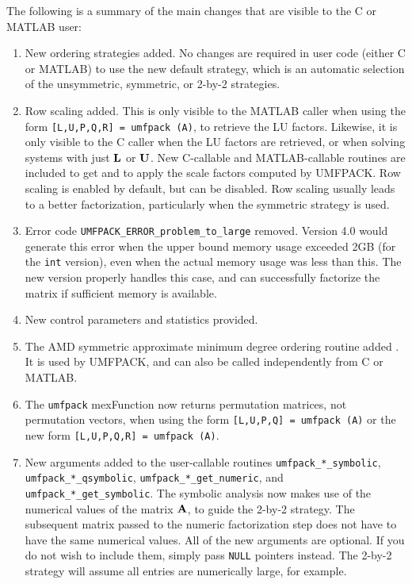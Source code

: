 \documentclass[11pt]{article}
\newcommand{\m}[1]{{\bf{#1}}}       %
\begin{document}
The following is a summary of the main changes that are visible to the C
or MATLAB user:

\begin{enumerate}

\item New ordering strategies added.  No changes are required in user code
    (either C or MATLAB) to use the new default strategy, which is an automatic
    selection of the unsymmetric, symmetric, or 2-by-2 strategies.

\item Row scaling added.  This is only visible to the MATLAB caller when using
    the form {\tt [L,U,P,Q,R] = umfpack (A)}, to retrieve the LU factors.
    Likewise, it is only visible to the C caller when the LU factors are
    retrieved, or when solving systems with just $\m{L}$ or $\m{U}$.
    New C-callable and MATLAB-callable routines are included to get and to
    apply the scale factors computed by UMFPACK.  Row scaling is enabled by
    default, but can be disabled.  Row scaling usually leads to a better
    factorization, particularly when the symmetric strategy is used.

\item Error code {\tt UMFPACK\_ERROR\_problem\_to\_large} removed.
    Version 4.0 would generate this error when the upper bound memory usage
    exceeded 2GB (for the {\tt int} version), even when the actual memory
    usage was less than this.  The new version properly handles this case,
    and can successfully factorize the matrix if sufficient memory is
    available.

\item New control parameters and statistics provided.

\item The AMD symmetric approximate minimum degree ordering routine added
    \cite{AmestoyDavisDuff96,AmestoyDavisDuff03}.
    It is used by UMFPACK, and can also be called independently from C or
    MATLAB.

\item The {\tt umfpack} mexFunction now returns permutation matrices, not
    permutation vectors, when using the form {\tt [L,U,P,Q] = umfpack (A)}
    or the new form {\tt [L,U,P,Q,R] = umfpack (A)}.

\item New arguments added to the user-callable routines
    {\tt umfpack\_*\_symbolic},
    {\tt umfpack\_*\_qsymbolic},
    {\tt umfpack\_*\_get\_numeric}, and
    {\tt umfpack\_*\_get\_symbolic}.
    The symbolic analysis now makes use of the numerical values of the matrix
    $\m{A}$, to guide the 2-by-2 strategy.  The subsequent matrix passed to
    the numeric factorization step does not have to have the same numerical
    values.  All of the new arguments are optional.  If you do not wish to
    include them, simply pass {\tt NULL} pointers instead.  The 2-by-2 strategy
    will assume all entries are numerically large, for example.


\end{enumerate}
\end{document}
